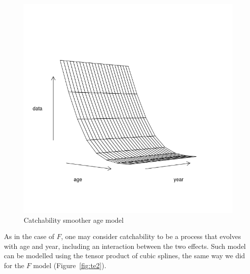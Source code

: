 \documentclass[a4paper,english,10pt]{article}\usepackage[]{graphicx}\usepackage[]{color}
\newenvironment{knitrout}{}{} %
\begin{document}
\begin{knitrout}
\color{fgcolor}\begin{figure}[H]

{\centering \includegraphics[width=.9\linewidth]{figure/smoothage-1} 

}

\caption[Catchability smoother age model]{Catchability smoother age model}\label{fig:smoothage}
\end{figure}


\end{knitrout}

As in the case of $F$, one may consider catchability to be a process that evolves with age and year, including an interaction between the two effects. Such model can be modelled using the tensor product of cubic splines, the same way we did for the $F$ model (Figure~\ref{fig:te2}).
\end{document}

